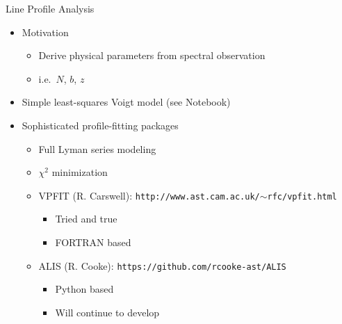 \documentclass[12pt,letterpaper]{article}
\begin{document}
\begin{Aenumerate}
{\bf \item Line Profile Analysis}
	\begin{itemize}
	\item Motivation
		\begin{itemize}
		\item Derive physical parameters from spectral observation
		\item i.e.\ $N$, $b$, $z$ 
		\end{itemize}
	\item Simple least-squares Voigt model  (see Notebook)
	\item Sophisticated profile-fitting packages
		\begin{itemize}
		\item Full Lyman series modeling
		\item $\chi^2$ minimization
		\item VPFIT (R. Carswell):  {\tt http://www.ast.cam.ac.uk/$\sim$rfc/vpfit.html}
			\begin{itemize}
			\item Tried and true
			\item FORTRAN based
			\end{itemize}
		\item ALIS (R. Cooke): {\tt https://github.com/rcooke-ast/ALIS}
			\begin{itemize}
			\item Python based
			\item Will continue to develop
			\end{itemize}
		\end{itemize}
	\end{itemize}

\end{Aenumerate}
\end{document}

